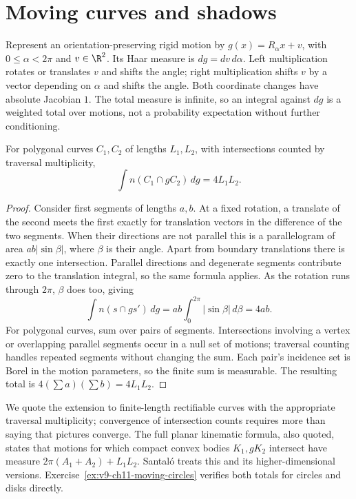 \section{Moving curves and shadows}

Represent an orientation-preserving rigid motion by $g(x)=R_\alpha x+v$, with $0\le\alpha<2\pi$ and $v\in\R^2$. Its Haar measure is $dg=dv\,d\alpha$. Left multiplication rotates or translates $v$ and shifts the angle; right multiplication shifts $v$ by a vector depending on $\alpha$ and shifts the angle. Both coordinate changes have absolute Jacobian $1$. The total measure is infinite, so an integral against $dg$ is a weighted total over motions, not a probability expectation without further conditioning.

\begin{theorem}[Poincaré, 1896]\label{thm:poincare}
For polygonal curves $C_1,C_2$ of lengths $L_1,L_2$, with intersections counted by traversal multiplicity,
\[
\int n(C_1\cap gC_2)\,dg=4L_1L_2.
\]
\end{theorem}

\begin{proof}
Consider first segments of lengths $a,b$. At a fixed rotation, a translate of the second meets the first exactly for translation vectors in the difference of the two segments. When their directions are not parallel this is a parallelogram of area $ab|\sin\beta|$, where $\beta$ is their angle. Apart from boundary translations there is exactly one intersection. Parallel directions and degenerate segments contribute zero to the translation integral, so the same formula applies. As the rotation runs through $2\pi$, $\beta$ does too, giving
\[
\int n(s\cap gs')\,dg=ab\int_0^{2\pi}|\sin\beta|\,d\beta=4ab.
\]
For polygonal curves, sum over pairs of segments. Intersections involving a vertex or overlapping parallel segments occur in a null set of motions; traversal counting handles repeated segments without changing the sum. Each pair's incidence set is Borel in the motion parameters, so the finite sum is measurable. The resulting total is $4(\sum a)(\sum b)=4L_1L_2$.
\end{proof}

We quote the extension to finite-length rectifiable curves with the appropriate traversal multiplicity; convergence of intersection counts requires more than saying that pictures converge. The full planar kinematic formula, also quoted, states that motions for which compact convex bodies $K_1,gK_2$ intersect have measure
$2\pi(A_1+A_2)+L_1L_2$. Santaló treats this and its higher-dimensional versions. Exercise~\ref{ex:v9-ch11-moving-circles} verifies both totals for circles and disks directly.

